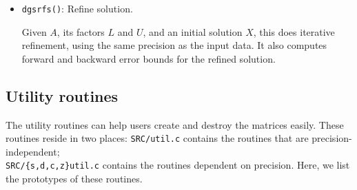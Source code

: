 \begin{itemize}
      {\tt dgsequ} first computes the row and column scalings $D_r$ 
      and $D_c$ which would make each row and each column of the scaled 
      matrix $D_rAD_c$ have equal norm. 
      {\tt dlaqgs} then applies them to the original matrix $A$ if it is 
      indeed badly scaled. The equilibrated $A$ overwrites the original $A$.

\item {\tt dgsrfs()}: Refine solution.

      Given $A$, its factors $L$ and $U$, and an initial solution $X$, 
      this does iterative refinement, using the same precision as the 
      input data. It also computes
      forward and backward error bounds for the refined solution.

\end{itemize}

\subsection{Utility routines}
\label{sec:slu_utility}

The utility routines can help users create and destroy the {\superlu}
matrices easily. These routines reside in two places: {\tt SRC/util.c}
contains the routines that are precision-independent;\\
{\tt SRC/\{s,d,c,z\}util.c} contains the routines dependent on precision.
Here, we list the prototypes of these routines.

